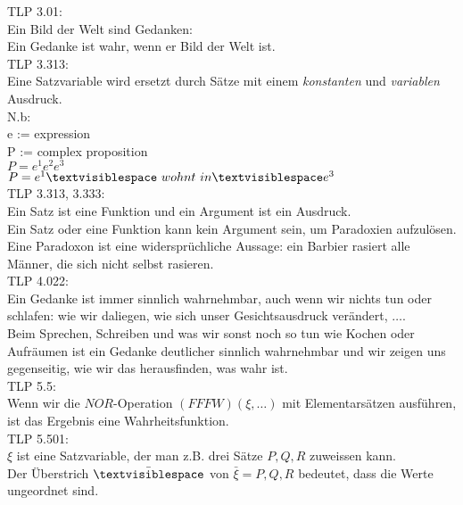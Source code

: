 \documentclass[10pt,a4paper]{article}
\begin{document}
TLP 3.01: \\
Ein Bild der Welt sind Gedanken: \\
Ein Gedanke ist wahr, wenn er Bild der Welt ist. \\

TLP 3.313: \\
Eine Satzvariable wird ersetzt durch Sätze mit einem {\it konstanten} und
{\it variablen} Ausdruck. \\
N.b: \\
e := expression \\
P := complex proposition \\
$P = e^1 e^2 e^3 $ \\
$P = e^1 {\textvisiblespace}\ wohnt\ in{\textvisiblespace} e^3$ \\

TLP 3.313, 3.333: \\
Ein Satz ist eine Funktion und ein Argument ist ein Ausdruck. \\
Ein Satz oder eine Funktion kann kein Argument sein, um Paradoxien aufzulösen. \\

Eine Paradoxon ist eine widersprüchliche Aussage: ein Barbier rasiert alle
Männer, die sich nicht selbst rasieren. \\

TLP 4.022: \\
Ein Gedanke ist immer sinnlich wahrnehmbar,
auch wenn wir nichts tun oder schlafen: wie wir daliegen, wie sich unser
Gesichtsausdruck verändert, $\ldots$. \\

Beim Sprechen, Schreiben und was wir sonst noch so tun wie Kochen oder \\
Aufräumen ist ein Gedanke deutlicher sinnlich wahrnehmbar und wir zeigen uns \\
gegenseitig, wie wir das herausfinden, was wahr ist. \\

TLP 5.5: \\
Wenn wir die $NOR$-Operation $(FFFW) (\xi, \ldots)$ mit Elementarsätzen
ausführen, ist das Ergebnis eine Wahrheitsfunktion. \\

TLP 5.501: \\
$\xi$ ist eine Satzvariable, der man z.B. drei Sätze $P, Q, R$ zuweissen kann. \\
Der Überstrich $\bar {\textvisiblespace}$ von $\bar \xi = P, Q, R$
bedeutet, dass die Werte ungeordnet sind. \\
\end{document}
